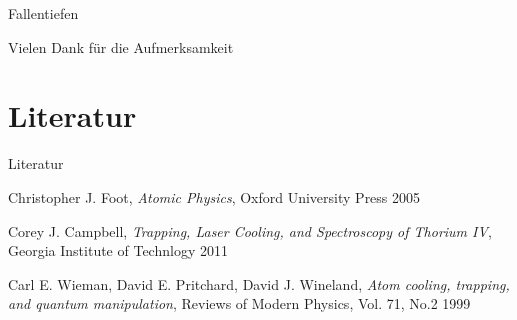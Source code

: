 \documentclass[12pt]{beamer}
\begin{document}
\begin{frame}{Fallentiefen}
\end{frame}

\begin{frame}{Vielen Dank für die Aufmerksamkeit}
\end{frame}

\section{Literatur}

\begin{frame}{Literatur}
	\begin{thebibliography}{9}
		Christopher J. Foot,
		\emph{Atomic Physics},
		Oxford University Press 2005
		
		Corey J. Campbell,
		\emph{Trapping, Laser Cooling, and Spectroscopy of Thorium IV},
		Georgia Institute of Technlogy 2011
		
		Carl E. Wieman, David E. Pritchard, David J. Wineland,
		\emph{Atom cooling, trapping, and quantum manipulation},
		Reviews of Modern Physics, Vol. 71, No.2 1999
		
	\end{thebibliography}
	
\end{frame}
\end{document}

